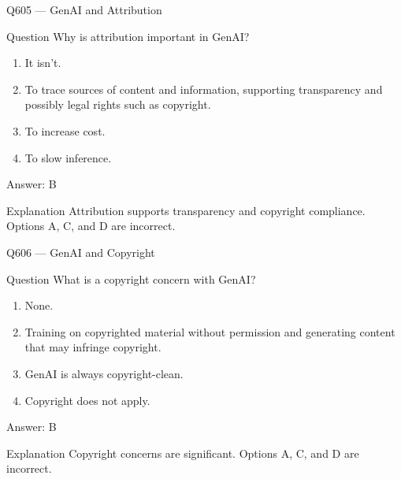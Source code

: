 \documentclass[aspectratio=169,8pt]{beamer}
\begin{document}
	\begin{frame}{Q605 --- GenAI and Attribution}
		\begin{block}{Question}
			Why is attribution important in GenAI?
			\begin{enumerate}
				\item It isn't.
				\item To trace sources of content and information, supporting transparency and possibly legal rights such as copyright.
				\item To increase cost.
				\item To slow inference.
			\end{enumerate}
		\end{block}
		\begin{exampleblock}{Answer: B}\end{exampleblock}
		\begin{block}{Explanation}
			Attribution supports transparency and copyright compliance. Options A, C, and D are incorrect.
		\end{block}
	\end{frame}
	
	\begin{frame}{Q606 --- GenAI and Copyright}
		\begin{block}{Question}
			What is a copyright concern with GenAI?
			\begin{enumerate}
				\item None.
				\item Training on copyrighted material without permission and generating content that may infringe copyright.
				\item GenAI is always copyright-clean.
				\item Copyright does not apply.
			\end{enumerate}
		\end{block}
		\begin{exampleblock}{Answer: B}\end{exampleblock}
		\begin{block}{Explanation}
			Copyright concerns are significant. Options A, C, and D are incorrect.
		\end{block}
	\end{frame}
	
\end{document}

